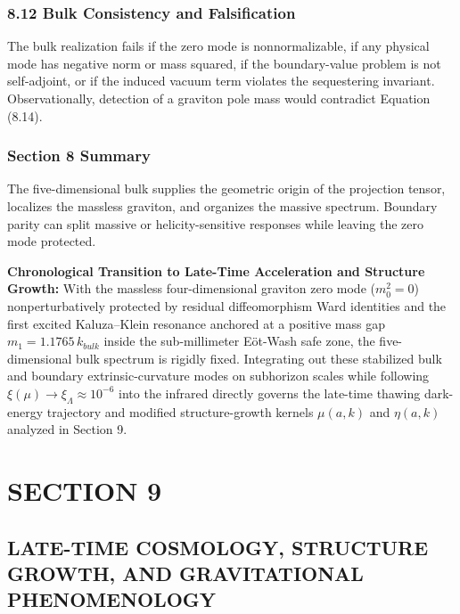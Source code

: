 \documentclass[aps,prd,onecolumn,superscriptaddress,nofootinbib,longbibliography,10pt]{revtex4-2}
\begin{document}
  
\subsubsection*{8.12 Bulk Consistency and Falsification}

  The bulk realization fails if the zero mode is nonnormalizable, if any physical mode has negative norm or mass squared, if the boundary-value problem is not self-adjoint, or if the induced vacuum term violates the sequestering invariant. Observationally, detection of a graviton pole mass would contradict Equation (8.14).


  
\subsubsection*{Section 8 Summary}

  The five-dimensional bulk supplies the geometric origin of the projection tensor, localizes the massless graviton, and organizes the massive spectrum. Boundary parity can split massive or helicity-sensitive responses while leaving the zero mode protected.


\textbf{Chronological Transition to Late-Time Acceleration and Structure Growth:} With the massless four-dimensional graviton zero mode (\(m_0^2 = 0\)) nonperturbatively protected by residual diffeomorphism Ward identities and the first excited Kaluza--Klein resonance anchored at a positive mass gap \(m_1 = 1.1765\,k_{bulk}\) inside the sub-millimeter E\"ot-Wash safe zone, the five-dimensional bulk spectrum is rigidly fixed. Integrating out these stabilized bulk and boundary extrinsic-curvature modes on subhorizon scales while following \(\xi(\mu) \to \xi_\Lambda \approx 10^{-6}\) into the infrared directly governs the late-time thawing dark-energy trajectory and modified structure-growth kernels \(\mu(a,k)\) and \(\eta(a,k)\) analyzed in Section 9.




 

  
\section*{SECTION 9}

  
\subsection*{LATE-TIME COSMOLOGY, STRUCTURE GROWTH, AND GRAVITATIONAL PHENOMENOLOGY}
\end{document}
